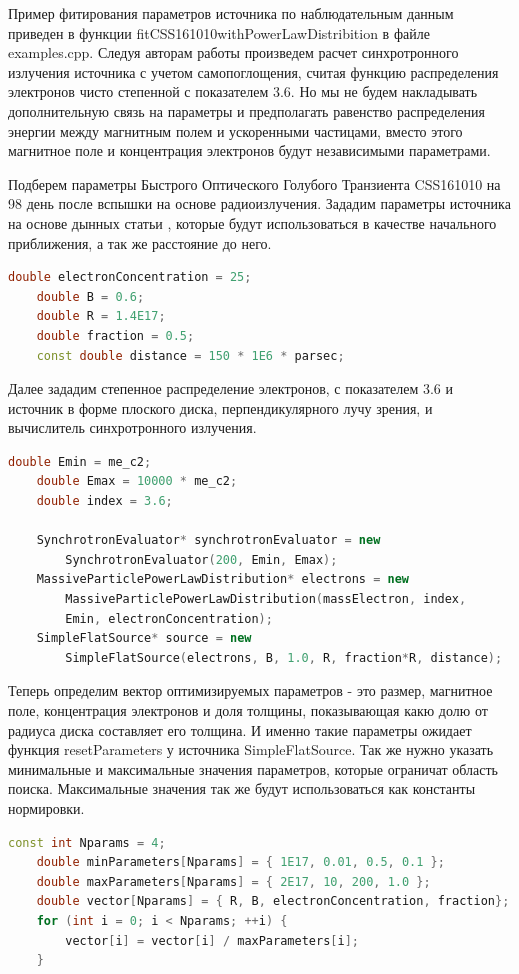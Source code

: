 Пример фитирования параметров источника по наблюдательным данным приведен в функции fitCSS161010withPowerLawDistribition в файле examples.cpp. Следуя авторам работы \cite{Coppejans2020} произведем расчет синхротронного излучения источника с учетом самопоглощения, считая функцию распределения электронов чисто степенной с показателем 3.6. Но мы не будем накладывать дополнительную связь на параметры и предполагать равенство распределения энергии между магнитным полем и ускоренными частицами, вместо этого магнитное поле и концентрация электронов будут независимыми параметрами.

Подберем параметры Быстрого Оптического Голубого Транзиента CSS161010 на 98 день после вспышки на основе радиоизлучения. Зададим параметры источника на основе дынных статьи \cite{Coppejans2020}, которые будут использоваться в качестве начального приближения, а так же расстояние до него.
\begin{lstlisting}[language=c++]
    double electronConcentration = 25;
    double B = 0.6;
    double R = 1.4E17;
    double fraction = 0.5;
    const double distance = 150 * 1E6 * parsec;
\end{lstlisting}
Далее зададим степенное распределение электронов, с показателем 3.6 и источник в форме плоского диска, перпендикулярного лучу зрения, и вычислитель синхротронного излучения.
\begin{lstlisting}[language=c++]
    double Emin = me_c2;
    double Emax = 10000 * me_c2;
    double index = 3.6;
	
    SynchrotronEvaluator* synchrotronEvaluator = new 
	    SynchrotronEvaluator(200, Emin, Emax);
    MassiveParticlePowerLawDistribution* electrons = new 
	    MassiveParticlePowerLawDistribution(massElectron, index, 
	    Emin, electronConcentration);
    SimpleFlatSource* source = new 
	    SimpleFlatSource(electrons, B, 1.0, R, fraction*R, distance);
\end{lstlisting}
Теперь определим вектор оптимизируемых параметров - это размер, магнитное поле, концентрация электронов и доля толщины, показывающая какю долю от радиуса диска составляет его толщина. И именно такие параметры ожидает функция resetParameters у источника SimpleFlatSource. Так же нужно указать минимальные и максимальные значения параметров, которые ограничат область поиска. Максимальные значения так же будут использоваться как константы нормировки.
\begin{lstlisting}[language=c++]
    const int Nparams = 4;
    double minParameters[Nparams] = { 1E17, 0.01, 0.5, 0.1 };
    double maxParameters[Nparams] = { 2E17, 10, 200, 1.0 };
    double vector[Nparams] = { R, B, electronConcentration, fraction};
    for (int i = 0; i < Nparams; ++i) {
	    vector[i] = vector[i] / maxParameters[i];
    }
\end{lstlisting}
